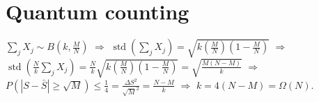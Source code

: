 \section{Quantum counting}

\ex $\sum_jX_j\sim B(k,\frac{M}{N})$ 
$\Rightarrow$ 
$\operatorname{std}(\sum_jX_j)=\sqrt{k\left(\frac{M}{N}\right)\left(1-\frac{M}{N}\right)}$ 
$\Rightarrow$ 
$\operatorname{std}\left(\frac{N}{k}\sum_jX_j\right)=\frac{N}{k}\sqrt{k\left(\frac{M}{N}\right)\left(1-\frac{M}{N}\right)}=\sqrt{\frac{M(N-M)}{k}}$ 
$\Rightarrow$ 
$P(|S-\bar{S}|\ge\sqrt{M})\le\frac{1}{4}=\frac{\Delta S^2}{\sqrt{M}^2}=\frac{N-M}{k}$
$\Rightarrow$ 
$k = 4(N-M) = \Omega(N)$.

\ex {}

